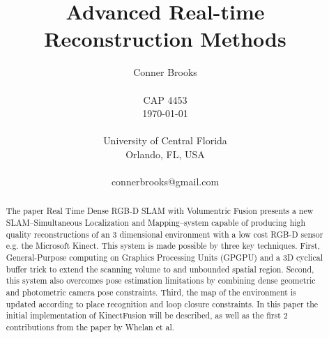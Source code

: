\documentclass[10pt, twocolumn]{article}
\begin{document}
\title{Advanced Real-time Reconstruction Methods}

\author{Conner Brooks\\
\\
CAP 4453\\
\today \\
\\
University of Central Florida\\
Orlando, FL, USA\\
\\
connerbrooks@gmail.com\\
}

\maketitle
\thispagestyle{empty}


\begin{abstract}
The paper Real Time Dense RGB-D SLAM with Volumentric Fusion \cite{whelan14} presents a new SLAM--Simultaneous Localization and Mapping--system capable of producing high quality
reconstructions of an 3 dimensional environment with a low cost RGB-D sensor e.g. the Microsoft Kinect. This system is made possible by three key techniques.
First, General-Purpose computing on Graphics Processing Units (GPGPU) and a 3D 
  cyclical buffer trick to extend the scanning volume to and unbounded spatial
  region. Second, this system also overcomes pose estimation limitations by combining
  dense geometric and photometric camera pose constraints. Third, the map of the 
  environment is updated according to place recognition and loop closure constraints.
  In this paper the initial implementation of KinectFusion \cite{izadi11} \cite{newcombe11} will be described, as well as the first 2 contributions from the paper by Whelan et al.
  
\end{abstract}
\end{document}
